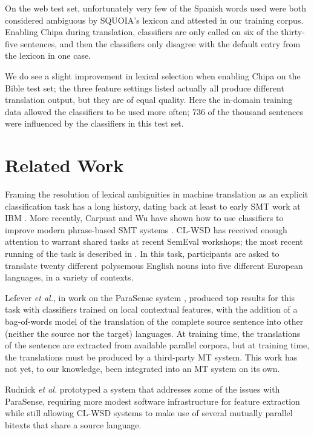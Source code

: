 \documentclass[10pt, a4paper]{article}
\begin{document}
On the web test set, unfortunately very few of the Spanish words used were both
considered ambiguous by SQUOIA's lexicon and attested in our training corpus.
Enabling Chipa during translation, classifiers are only called on six of the
thirty-five sentences, and then the classifiers only disagree with the default
entry from the lexicon in one case.

We do see a slight improvement in lexical selection when enabling Chipa on the
Bible test set; the three feature settings listed actually all produce
different translation output, but they are of equal quality. Here the in-domain
training data allowed the classifiers to be used more often; 736 of the
thousand sentences were influenced by the classifiers in this test set.

\section{Related Work}
Framing the resolution of lexical ambiguities in machine translation
as an explicit classification
task has a long history, dating back at least to early SMT work at IBM
\cite{Brown91word-sensedisambiguation}.  More recently, Carpuat and Wu have
shown how to use classifiers to improve modern phrase-based SMT systems
\cite{carpuatpsd}.
CL-WSD has received enough attention to warrant shared tasks at recent SemEval
workshops; the most recent running of the task is described in \cite{task10}.
In this task, participants are asked to translate twenty different polysemous
English nouns into five different European languages, in a variety of contexts.

Lefever \emph{et al.}, in work on the ParaSense system
, produced top results for
this task with classifiers trained on local contextual features, with the 
addition of a bag-of-words model of the translation of the complete source
sentence into other (neither the source nor the target) languages. At training
time, the translations of the sentence are extracted from available parallel
corpora, but at training time, the translations must be produced by a
third-party MT system.
This work has not yet, to our knowledge, been integrated into an MT system
on its own.

Rudnick \emph{et al.} 
prototyped a system that addresses some of the issues with ParaSense, requiring
more modest software infrastructure for feature extraction while still allowing
CL-WSD systems to make use of several mutually parallel bitexts that share a
source language.
\end{document}
